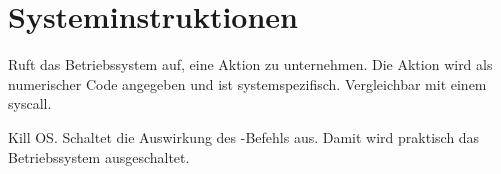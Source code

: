 \section{Systeminstruktionen}

Ruft das Betriebssystem auf, eine Aktion zu unternehmen. 
Die Aktion wird als numerischer Code angegeben und ist systemspezifisch.
Vergleichbar mit einem \glqq syscall\grqq.



\glqq Kill OS\grqq.
Schaltet die Auswirkung des -Befehls aus.
Damit wird praktisch das Betriebssystem ausgeschaltet.


